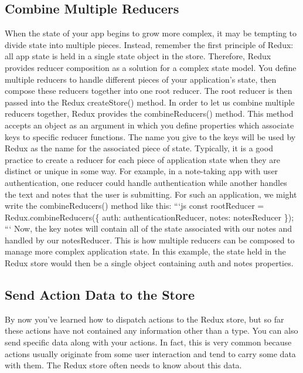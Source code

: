 \documentclass{article}%
\begin{document}
\subsection{Combine Multiple Reducers}%
\label{subsec:CombineMultipleReducers}%
When the state of your app begins to grow more complex, it may be tempting to divide state into multiple pieces. Instead, remember the first principle of Redux: all app state is held in a single state object in the store. Therefore, Redux provides reducer composition as a solution for a complex state model. You define multiple reducers to handle different pieces of your application's state, then compose these reducers together into one root reducer. The root reducer is then passed into the Redux createStore() method.\newline%
In order to let us combine multiple reducers together, Redux provides the combineReducers() method. This method accepts an object as an argument in which you define properties which associate keys to specific reducer functions. The name you give to the keys will be used by Redux as the name for the associated piece of state.\newline%
Typically, it is a good practice to create a reducer for each piece of application state when they are distinct or unique in some way. For example, in a note{-}taking app with user authentication, one reducer could handle authentication while another handles the text and notes that the user is submitting. For such an application, we might write the combineReducers() method like this:\newline%
```js\newline%
const rootReducer = Redux.combineReducers(\{\newline%
  auth: authenticationReducer,\newline%
  notes: notesReducer\newline%
\});\newline%
```\newline%
Now, the key notes will contain all of the state associated with our notes and handled by our notesReducer. This is how multiple reducers can be composed to manage more complex application state. In this example, the state held in the Redux store would then be a single object containing auth and notes properties.\newline%

%
\subsection{Send Action Data to the Store}%
\label{subsec:SendActionDatatotheStore}%
By now you've learned how to dispatch actions to the Redux store, but so far these actions have not contained any information other than a type. You can also send specific data along with your actions. In fact, this is very common because actions usually originate from some user interaction and tend to carry some data with them. The Redux store often needs to know about this data.\newline%
\end{document}
